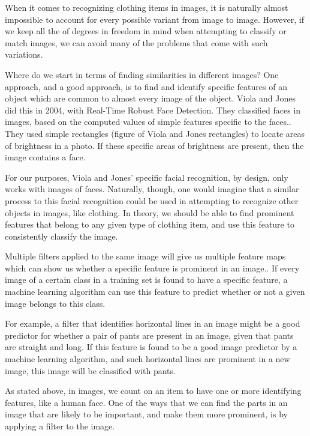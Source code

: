 \documentclass[12pt]{article} %
\begin{document}
	When it comes to recognizing clothing items in images, it is naturally almost impossible to account for every possible variant from image to image. However, if we keep all the of degrees in freedom in mind when attempting to classify or match images, we can avoid many of the problems that come with such variations. 

Where do we start in terms of finding similarities in different images? One approach, and a good approach, is to find and identify specific features of an object which are common to almost every image of the object. Viola and Jones did this in 2004, with Real-Time Robust Face Detection. They classified faces in images, based on the computed values of simple features specific to the faces.\cite{viola2004robust}. They used simple rectangles (figure of Viola and Jones rectangles) to locate areas of brightness in a photo. If these specific areas of brightness are present, then the image contains a face. 

For our purposes, Viola and Jones' specific facial recognition, by design, only works with images of faces. Naturally, though, one would imagine that a similar process to this facial recognition could be used in attempting to recognize other objects in images, like clothing. In theory, we should be able to find prominent features that belong to any given type of clothing item, and use this feature to consistently classify the image.

	
	Multiple filters applied to the same image will give us multiple feature maps which can show us whether a specific feature is prominent in an image.\cite{aurelienMachineLearning}. If every image of a certain class in a training set is found to have a specific feature, a machine learning algorithm can use this feature to predict whether or not a given image belongs to this class.

For example, a filter that identifies horizontal lines in an image might be a good predictor for whether a pair of pants are present in an image, given that pants are straight and long. If this feature is found to be a good image predictor by a machine learning algorithm, and such horizontal lines are prominent in a new image, this image will be classified with pants. 
	
		
	 As stated above, in images, we count on an item to have one or more identifying features, like a human face. One of the ways that we can find the parts in an image that are likely to be important, and make them more prominent, is by applying a filter to the image. 
\end{document}
